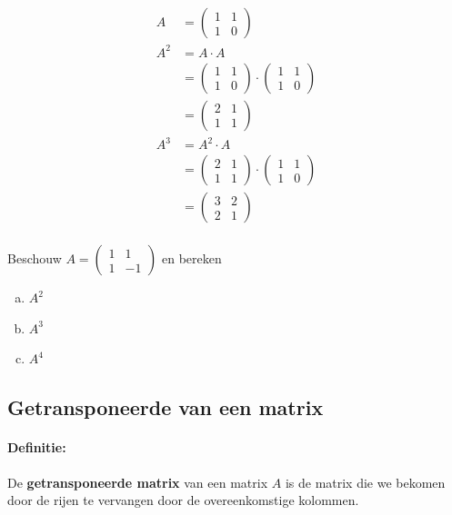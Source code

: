 \documentclass[12pt,twoside]{article}
\begin{document}
\begin{align*}
  A &= \begin{pmatrix}1 & 1\\ 1 & 0\end{pmatrix}\\
  A^2 &= A \cdot A\\
    &= \begin{pmatrix}1 & 1\\ 1 & 0\end{pmatrix} \cdot \begin{pmatrix}1 & 1\\ 1 & 0\end{pmatrix}\\
    &= \begin{pmatrix}2 & 1\\ 1 & 1\end{pmatrix}\\
  A^3 &= A^2 \cdot A\\
    &= \begin{pmatrix}2 & 1\\ 1 & 1\end{pmatrix} \cdot \begin{pmatrix}1 & 1\\ 1 & 0\end{pmatrix}\\
    &= \begin{pmatrix}3 & 2\\ 2 & 1\end{pmatrix}\\
\end{align*}

 Beschouw $A=\begin{pmatrix}1 & 1\\ 1 & -1\end{pmatrix}$ en bereken
\begin{multicols}{3}
\begin{enumerate}[(a)]
\item $A^2$
\item $A^3$
\item $A^4$
\end{enumerate}
\end{multicols}


\subsection{Getransponeerde van een matrix}

\paragraph*{Definitie:} De {\bf getransponeerde matrix} van een matrix $A$ is de matrix die we bekomen door de rijen te vervangen door de overeenkomstige kolommen.
\end{document}

